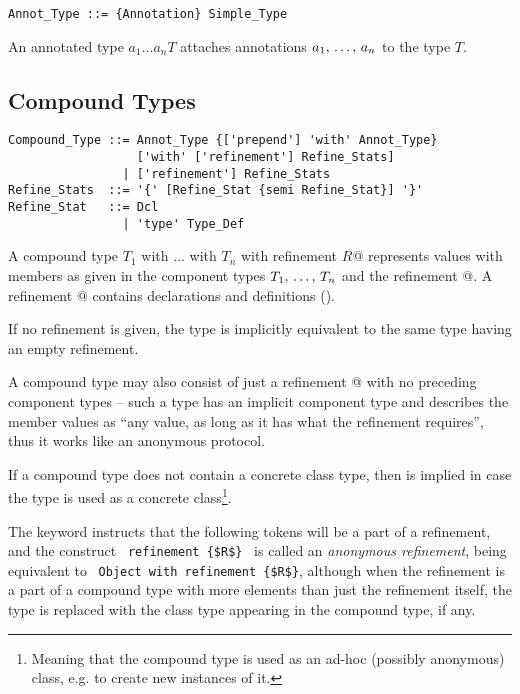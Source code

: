 \syntax\begin{lstlisting}
Annot_Type ::= {Annotation} Simple_Type
\end{lstlisting}

An annotated type $a_1 \ldots a_n T$ attaches annotations $a_1 ,\, \ldots ,\, a_n$ to the type $T$. %






\subsection{Compound Types}
\label{sec:compound-types}

\syntax\begin{lstlisting}
Compound_Type ::= Annot_Type {['prepend'] 'with' Annot_Type} 
                  ['with' ['refinement'] Refine_Stats]
                | ['refinement'] Refine_Stats
Refine_Stats  ::= '{' [Refine_Stat {semi Refine_Stat}] '}'
Refine_Stat   ::= Dcl
                | 'type' Type_Def
\end{lstlisting} %

A compound type \lstinline@$T_1$ with $\ldots$ with $T_n$ with refinement {$R$}@ represents values with members as given in the component types $T_1 ,\, \ldots ,\, T_n$ and the refinement @. A refinement @ contains declarations and definitions (). 

If no refinement is given, the type is implicitly equivalent to the same type having an empty refinement. 

A compound type may also consist of just a refinement @ with no preceding component types -- such a type has an implicit component type  and describes the member values as ``any value, as long as it has what the refinement requires'', thus it works like an anonymous protocol. 

If a compound type does not contain a concrete class type, then  is implied in case the type is used as a concrete class\footnote{Meaning that the compound type is used as an ad-hoc (possibly anonymous) class, e.g. to create new instances of it.}.

The keyword  instructs that the following tokens will be a part of a refinement, and the construct ~\lstinline!refinement {$R$}!~ is called an {\em anonymous refinement}, being equivalent to ~\lstinline!Object with refinement {$R$}!, although when the refinement is a part of a compound type with more elements than just the refinement itself, the  type is replaced with the class type appearing in the compound type, if any. 

